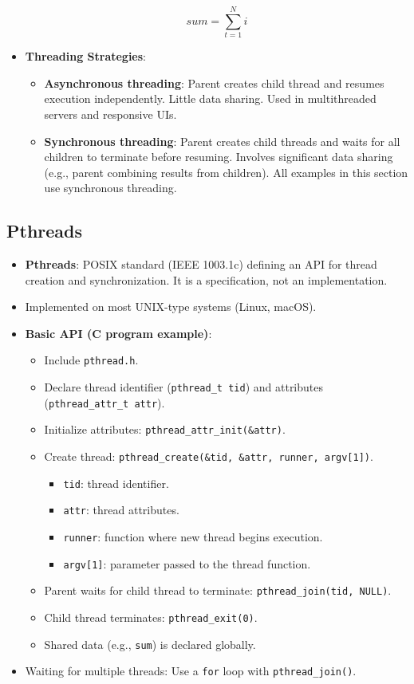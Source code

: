 \begin{itemize}
    $$sum = \sum_{t = 1}^N i$$
    \item \textbf{Threading Strategies}:
        \begin{itemize}
            \item \textbf{Asynchronous threading}: Parent creates child thread and resumes execution independently. Little data sharing. Used in multithreaded servers and responsive UIs.
            \item \textbf{Synchronous threading}: Parent creates child threads and waits for all children to terminate before resuming. Involves significant data sharing (e.g., parent combining results from children). All examples in this section use synchronous threading.
        \end{itemize}
\end{itemize}

\subsection{Pthreads}
\begin{itemize}
    \item \textbf{Pthreads}: POSIX standard (IEEE 1003.1c) defining an API for thread creation and synchronization. It is a specification, not an implementation.
    \item Implemented on most UNIX-type systems (Linux, macOS).
    \item \textbf{Basic API (C program example)}:
        \begin{itemize}
            \item Include \texttt{pthread.h}.
            \item Declare thread identifier (\texttt{pthread\_t tid}) and attributes (\texttt{pthread\_attr\_t attr}).
            \item Initialize attributes: \texttt{pthread\_attr\_init(\&attr)}.
            \item Create thread: \texttt{pthread\_create(\&tid, \&attr, runner, argv[1])}.
                \begin{itemize}
                    \item \texttt{tid}: thread identifier.
                    \item \texttt{attr}: thread attributes.
                    \item \texttt{runner}: function where new thread begins execution.
                    \item \texttt{argv[1]}: parameter passed to the thread function.
                \end{itemize}
            \item Parent waits for child thread to terminate: \texttt{pthread\_join(tid, NULL)}.
            \item Child thread terminates: \texttt{pthread\_exit(0)}.
            \item Shared data (e.g., \texttt{sum}) is declared globally.
        \end{itemize}
    \item Waiting for multiple threads: Use a \texttt{for} loop with \texttt{pthread\_join()}.
\end{itemize}

